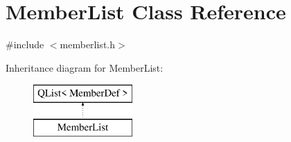 \hypertarget{class_member_list}{}\section{Member\+List Class Reference}
\label{class_member_list}


{\ttfamily \#include $<$memberlist.\+h$>$}

Inheritance diagram for Member\+List\+:\begin{figure}[H]
\begin{center}
\leavevmode
\includegraphics[height=2.000000cm]{class_member_list}
\end{center}
\end{figure}
